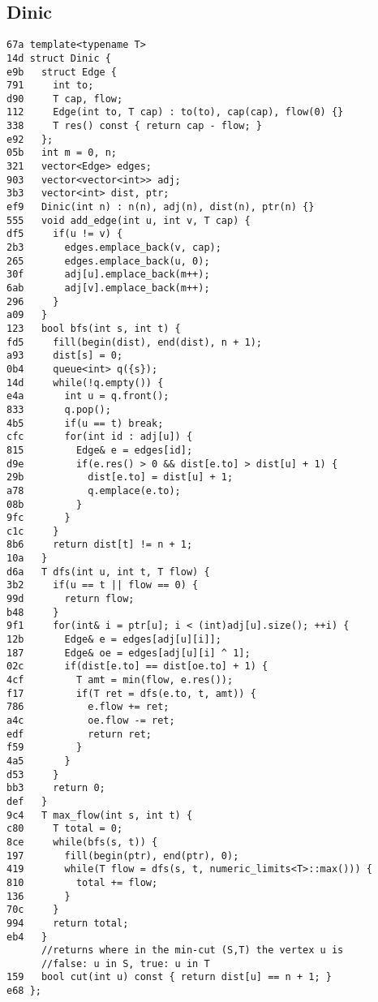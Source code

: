 \documentclass[10pt, a4paper, twoside]{article}
\begin{document}
\subsection{Dinic
}
\begin{lstlisting}
67a template<typename T>
14d struct Dinic {
e9b   struct Edge {
791     int to;
d90     T cap, flow;
112     Edge(int to, T cap) : to(to), cap(cap), flow(0) {}
338     T res() const { return cap - flow; }
e92   };
05b   int m = 0, n;
321   vector<Edge> edges;
903   vector<vector<int>> adj;
3b3   vector<int> dist, ptr;
ef9   Dinic(int n) : n(n), adj(n), dist(n), ptr(n) {}
555   void add_edge(int u, int v, T cap) {
df5     if(u != v) {
2b3       edges.emplace_back(v, cap);
265       edges.emplace_back(u, 0);
30f       adj[u].emplace_back(m++);
6ab       adj[v].emplace_back(m++);
296     }	
a09   }
123   bool bfs(int s, int t) {
fd5     fill(begin(dist), end(dist), n + 1);
a93     dist[s] = 0;
0b4     queue<int> q({s});
14d     while(!q.empty()) {
e4a       int u = q.front();
833       q.pop();
4b5       if(u == t) break;
cfc       for(int id : adj[u]) {
815         Edge& e = edges[id];
d9e         if(e.res() > 0 && dist[e.to] > dist[u] + 1) {
29b           dist[e.to] = dist[u] + 1;
a78           q.emplace(e.to);
08b         }
9fc       }
c1c     }
8b6     return dist[t] != n + 1;
10a   }
d6a   T dfs(int u, int t, T flow) {
3b2     if(u == t || flow == 0) {
99d       return flow;
b48     }
9f1     for(int& i = ptr[u]; i < (int)adj[u].size(); ++i) {
12b       Edge& e = edges[adj[u][i]];
187       Edge& oe = edges[adj[u][i] ^ 1];
02c       if(dist[e.to] == dist[oe.to] + 1) {
4cf         T amt = min(flow, e.res());
f17         if(T ret = dfs(e.to, t, amt)) {
786           e.flow += ret;
a4c           oe.flow -= ret;
edf           return ret;
f59         }
4a5       }
d53     }
bb3     return 0;
def   }
9c4   T max_flow(int s, int t) {
c80     T total = 0;
8ce     while(bfs(s, t)) {
197       fill(begin(ptr), end(ptr), 0);
419       while(T flow = dfs(s, t, numeric_limits<T>::max())) {
810         total += flow;
136       }
70c     }
994     return total;
eb4   }
      //returns where in the min-cut (S,T) the vertex u is
      //false: u in S, true: u in T
159   bool cut(int u) const { return dist[u] == n + 1; }
e68 };
\end{lstlisting}
\end{document}
